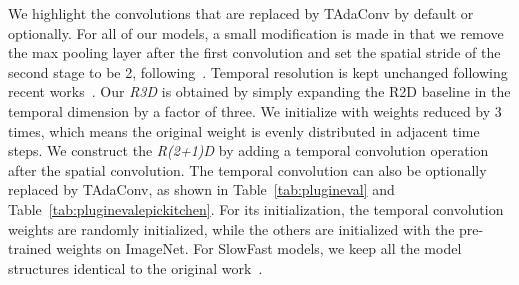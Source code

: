 \documentclass{article} \usepackage{iclr2022_conference,times}
\begin{document}
We highlight the convolutions that are replaced by TAdaConv by default or optionally.
For all of our models, a small modification is made in that we remove the max pooling layer after the first convolution and set the spatial stride of the second stage to be 2, following~\citet{corrnet}. 
Temporal resolution is kept unchanged following recent works~\citep{slowfast,tea,stm}. 
Our \textit{R3D} is obtained by simply expanding the R2D baseline in the temporal dimension by a factor of three. 
We initialize with weights reduced by 3 times, which means the original weight is evenly distributed in adjacent time steps.
We construct the \textit{R(2+1)D} by adding a temporal convolution operation after the spatial convolution. 
The temporal convolution can also be optionally replaced by TAdaConv, as shown in Table~\ref{tab:plugineval} and Table~\ref{tab:pluginevalepickitchen}.
For its initialization, the temporal convolution weights are randomly initialized, while the others are initialized with the pre-trained weights on ImageNet.
For SlowFast models, we keep all the model structures identical to the original work~\citep{slowfast}.
\end{document}
